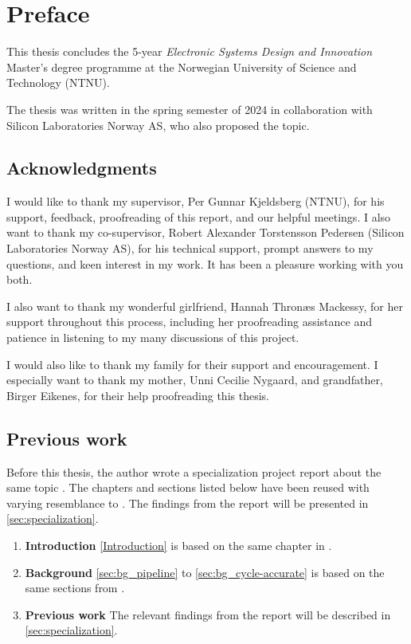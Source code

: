 \chapter*{Preface}


This thesis concludes the 5-year \textit{Electronic Systems Design and Innovation} Master's degree programme at the Norwegian University of Science and Technology (NTNU).  

The thesis was written in the spring semester of 2024 in collaboration with Silicon Laboratories Norway AS, who also proposed the topic.


\section*{Acknowledgments}


I would like to thank my supervisor, Per Gunnar Kjeldsberg (NTNU), for his support, feedback, proofreading of this report, and our helpful meetings. I also want to thank my co-supervisor, Robert Alexander Torstensson Pedersen (Silicon Laboratories Norway AS), for his technical support, prompt answers to my questions, and keen interest in my work. It has been a pleasure working with you both.


I also want to thank my wonderful girlfriend, Hannah Thronæs Mackessy, for her support throughout this process, including her proofreading assistance and patience in listening to my many discussions of this project.

I would also like to thank my family for their support and encouragement. I especially want to thank my mother, Unni Cecilie Nygaard, and grandfather, Birger Eikenes, for their help proofreading this thesis.


\section*{Previous work}

Before this thesis, the author wrote a specialization project report about the same topic \cite{torjenygaardeikenesDesigningRISCVReference2023}. The chapters and sections listed below have been reused with varying resemblance to \cite{torjenygaardeikenesDesigningRISCVReference2023}. The findings from the report will be presented in \cref{sec:specialization}.


\begin{enumerate}
    \item \textbf{Introduction} \cref{Introduction} is based on the same chapter in \cite{torjenygaardeikenesDesigningRISCVReference2023}.
    \item \textbf{Background} \cref{sec:bg_pipeline} to \cref{sec:bg_cycle-accurate} is based on the same sections from \cite{torjenygaardeikenesDesigningRISCVReference2023}.
    \item \textbf{Previous work} The relevant findings from the report will be described in \cref{sec:specialization}.
\end{enumerate}


